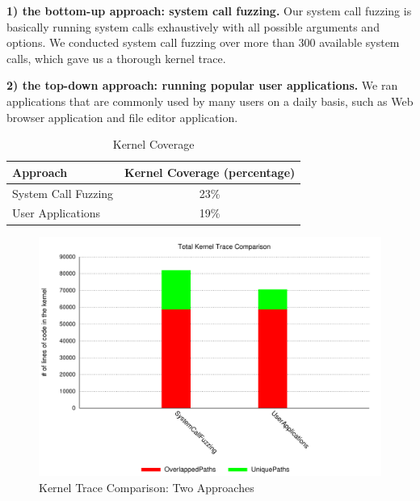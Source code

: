 \textbf{1) the bottom-up approach: system call fuzzing.}
Our system call fuzzing is basically running system calls exhaustively with all possible 
arguments and options. We conducted system call fuzzing over more than 300 available system calls, 
which gave us a thorough kernel trace. 

\textbf{2) the top-down approach: running popular user applications.} 
We ran applications that are commonly used by many users on a daily basis, such as Web browser application
and file editor application.  

\begin{table}[ht]
\centering
\begin{tabular}{|l|c|}
  \hline
  Approach & Kernel Coverage (percentage) \\
  \hline \hline
  System Call Fuzzing & 23\% \\
  \hline
  User Applications & 19\% \\
  \hline
\end{tabular}
\caption {Kernel Coverage}
\label{table:kernel_coverage}
\end{table}

\begin{figure}[h]
\centering
\includegraphics[width=1.0\columnwidth]{diagram/lind_ccs15_diagram_01.pdf}
\caption{Kernel Trace Comparison: Two Approaches}
\label{fig:two_approaches_trace}
\end{figure}

